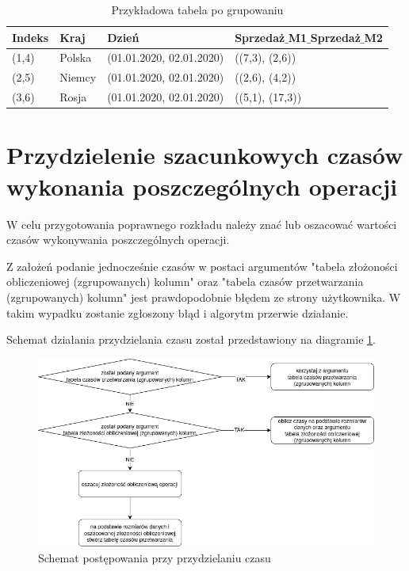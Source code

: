 \documentclass[brudnopis]{xmgr}
\begin{document}
\begin{table}[!tbh]
\begin{tabular}{|l|l|l|l|} \hline
Indeks & Kraj & Dzień & Sprzedaż$\_$M1$\_$Sprzedaż$\_$M2 \\ \hline
(1,4) & Polska & (01.01.2020, 02.01.2020) & ((7,3), (2,6)) \\ \hline
(2,5) & Niemcy & (01.01.2020, 02.01.2020) & ((2,6), (4,2)) \\ \hline
(3,6) & Rosja & (01.01.2020, 02.01.2020) & ((5,1), (17,3)) \\ \hline
\end{tabular}
\caption{Przykładowa tabela po grupowaniu\label{tab:example-output}}
\end{table}

\newpage
\section{Przydzielenie szacunkowych czasów wykonania poszczególnych operacji}

W celu przygotowania poprawnego rozkładu należy znać lub oszacować wartości czasów wykonywania poszczególnych operacji.

Z założeń podanie jednocześnie czasów w postaci argumentów "tabela złożoności obliczeniowej (zgrupowanych) kolumn" oraz "tabela czasów przetwarzania (zgrupowanych) kolumn" jest prawdopodobnie błędem ze strony użytkownika. W takim wypadku zostanie zgłoszony błąd i algorytm przerwie działanie.

Schemat działania przydzielania czasu został przedstawiony na diagramie \ref{diag:time-assign}.

\begin{figure}[!tbh]
\centering
\includegraphics[width=.8\hsize]{fig/przydzielanie_czasow.png}
\caption{Schemat postępowania przy przydzielaniu czasu\label{diag:time-assign}}
\end{figure}
\end{document}
